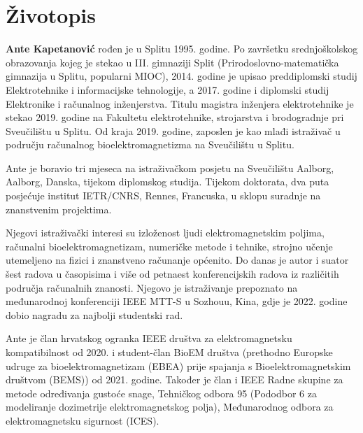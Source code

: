 \section*{Životopis}
\vspace{15mm}
\noindent
\textbf{Ante Kapetanović} rođen je u Splitu 1995. godine.
Po završetku srednjoškolskog obrazovanja kojeg je stekao u III. gimnaziji Split (Prirodoslovno-matematička gimnazija u Splitu, popularni MIOC), 2014. godine je upisao preddiplomski studij Elektrotehnike i informacijske tehnologije, a 2017. godine i diplomski studij Elektronike i računalnog inženjerstva.
Titulu magistra inženjera elektrotehnike je stekao 2019. godine na Fakultetu elektrotehnike, strojarstva i brodogradnje pri Sveučilištu u Splitu.
Od kraja 2019. godine, zaposlen je kao mlađi istraživač u području računalnog bioelektromagnetizma na Sveučilištu u Splitu.

Ante je boravio tri mjeseca na istraživačkom posjetu na Sveučilištu Aalborg, Aalborg, Danska, tijekom diplomskog studija.
Tijekom doktorata, dva puta posjećuje institut IETR/CNRS, Rennes, Francuska, u sklopu suradnje na znanstvenim projektima.

Njegovi istraživački interesi su izloženost ljudi elektromagnetskim poljima, računalni bioelektromagnetizam, numeričke metode i tehnike, strojno učenje utemeljeno na fizici i znanstveno računanje općenito.
Do danas je autor i suator šest radova u časopisima i više od petnaest konferencijskih radova iz različitih područja računalnih znanosti.
Njegovo je istraživanje prepoznato na međunarodnoj konferenciji IEEE MTT-S u Sozhouu, Kina, gdje je 2022. godine dobio nagradu za najbolji studentski rad.

Ante je član hrvatskog ogranka IEEE društva za elektromagnetsku kompatibilnost od 2020. i student-član BioEM društva (prethodno Europske udruge za bioelektromagnetizam (EBEA) prije spajanja s Bioelektromagnetskim društvom (BEMS)) od 2021. godine.
Također je član i IEEE Radne skupine za metode određivanja gustoće snage, Tehničkog odbora 95 (Pododbor 6 za modeliranje dozimetrije elektromagnetskog polja), Međunarodnog odbora za elektromagnetsku sigurnost (ICES).
\newpage